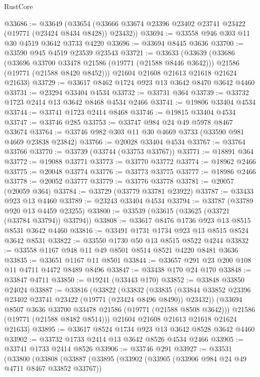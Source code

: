 \begin{lexlean}{RustCore}
\begin{coremodule}
@33686 := @33649
    (@33654 (@33666 @33674 @23396 @23402 @23741 @23422 (@19771 (@23424 @8434 @8428)) @23432))
@33694 := @33558 @946 @303 @11 @30 @4519 @3642 @3733 @4220
@33696 := @33694 @8445 @3636
@33700 := @33590 @945 @4519 @23539 @23543
@33721 := @33633
    (@33639
      (@33686
        (@33696 @33700 @33478 @21586 (@19771 (@21588 @8446 @3642)))
        @21586
        (@19771 (@21588 @8420 @8452)))
      @21604
      @21608
      @21613
      @21618
      @21624
      @21633)
@33729 := @33617 @8462 @1724 @923 @13 @3642 @8470 @3642 @4460
@33731 := @23294 @33404 @4534
@33732 := @33731 @364
@33739 := @33732 @1723 @2414 @13 @3642 @8468 @4534 @2466
@33741 := @19806 @33404 @4534
@33744 := @33741 @1723 @2414 @8468
@33746 := @19815 @33404 @4534
@33747 := @33746 @285
@33753 := @33747 @984 @24 @49 @5978 @8467 @33674
@33764 := @33746 @982 @303 @11 @30 @4669 @3733 (@33590 @981 @4669 @23838 @23842)
@33766 := @20028 @33404 @4534
@33767 := @33764 @33766
@33770 := @33739 (@33744 (@33753 @33767))
@33771 := @18891 @364
@33772 := @19088 @33771
@33773 := @33770 @33772
@33774 := @18962 @2466
@33775 := @20048 @33774
@33776 := @33773 @33775
@33777 := @18986 @2466
@33778 := @20052 @33777
@33779 := @33776 @33778
@33781 := @20057 (@20059 @364)
@33784 := @33729 (@33779 @33781 @23922)
@33787 := @33433 @923 @13 @4460
@33789 := @23243 @33404 @4534
@33794 := @33787 (@33789 @920 @13 @4459 @23255)
@33800 := @33539 (@33615 (@33625 (@33721 (@33784 @33794)) @33794))
@33808 := @33617 @8476 @1736 @923 @13 @8515 @8531 @3642 @4460
@33816 := @33491 @1731 @1734 @923 @13 @8515 @8524 @3642 @8531
@33822 := @33550 @1730 @50 @13 @8515 @8522 @4244
@33832 := @33558 @1167 @948 @11 @49 @8501 @8514 @8521 @4220 @8481 @3636
@33835 := @33651 @1167 @11 @8501
@33844 := @33657 @291 @23 @200 @108 @11 @4711 @4472 @8489 @8496
@33847 := @33438 @170 @24 @170
@33848 := @33847 @4711
@33850 := @19241 (@33443 @170)
@33852 := @33848 @33850 @24024
@33887 := @33816
    (@33822
      (@33832
        (@33835 (@33844 @33852 @23396 @23402 @23741 @23422 (@19771 (@23424 @8496 @8490)) @23432))
        (@33694 @8507 @3636 @33700 @33478 @21586 (@19771 (@21588 @8508 @3642)))
        @21586
        (@19771 (@21588 @8482 @8514)))
      @21604
      @21608
      @21613
      @21618
      @21624
      @21633)
@33895 := @33617 @8524 @1734 @923 @13 @3642 @8528 @3642 @4460
@33902 := @33732 @1733 @2414 @13 @3642 @8526 @4534 @2466
@33905 := @33741 @1733 @2414 @8526
@33906 := @33746 @291
@33927 := @33531
    (@33800
      (@33808
        (@33887
          (@33895
            (@33902
              (@33905 (@33906 @984 @24 @49 @4711 @8467 @33852 @33767))

\end{coremodule}
\end{lexlean}
